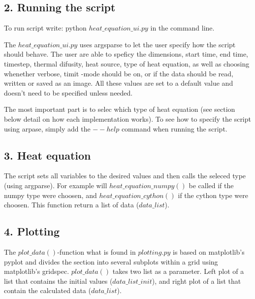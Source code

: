\documentclass[a4paper]{article}
\begin{document}
\subsection*{2. Running the script}
\begin{flushleft}                           

To run script write: python $heat\_equation\_ui.py$ in the command line. \newline

The $heat\_equation\_ui.py$ uses argsparse to let the user specify how the script should behave. The user are able to speficy the dimensions, start time, end time, timestep, thermal difusity, heat source, type of heat equation, as well as choosing whenether verbose, timit -mode should be on, or if the data should be read, written or saved as an image. All these values are set to a default value and doesn't need to be specified unless needed.\newline 

The most important part is to selec which type of heat equation (see section below detail on how each implementation works). To see how to specify the script using arpase, simply add the $--help$ command when running the script.
\end{flushleft}                           

\subsection*{3. Heat equation}
\begin{flushleft}                           
The script sets all variables to the desired values and then calls the seleced type (using argparse). For example will $heat\_equation\_numpy()$ be called if the numpy type were choosen, and $heat\_equation\_cython()$ if the cython type were choosen. This function return a list of data ($data\_list$).
\end{flushleft}  

\subsection*{4. Plotting}
\begin{flushleft}  
The $plot\_data()$-function what is found in $plotting.py$ is based on matplotlib's pyplot and divides the section into several subplots within a grid using matplotlib's gridspec. $plot\_data()$ takes two list as a parameter. Left plot of a list that contains the initial values ($data\_list\_init$), and right plot of a list that contain the calculated data ($data\_list$). 
\end{flushleft}           
\end{document}
